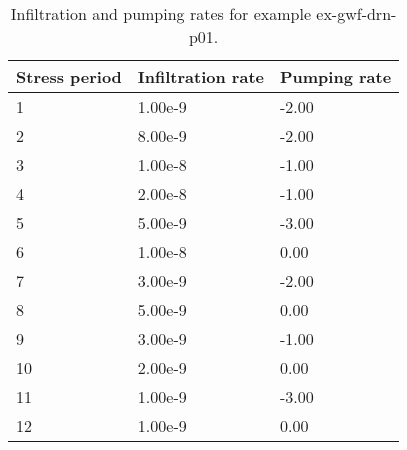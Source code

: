 \small
\begin{longtable}[!htbp]{
                                      p{}
                                      p{}
                                      p{}
                                      }
	\caption{Infiltration and pumping rates for example ex-gwf-drn-p01.} \label{tab:ex-gwf-drn-p01-02} \\

	\hline \hline
	\rowcolor{Gray}
	\textbf{Stress period} & \textbf{Infiltration rate} & \textbf{Pumping rate}  \\
	\hline
	\endhead

		1 & 1.00e-9 & -2.00 \\
		\rowcolor{Gray}
		2 & 8.00e-9 & -2.00 \\
		3 & 1.00e-8 & -1.00 \\
		\rowcolor{Gray}
		4 & 2.00e-8 & -1.00 \\
		5 & 5.00e-9 & -3.00 \\
		\rowcolor{Gray}
		6 & 1.00e-8 & 0.00 \\
		7 & 3.00e-9 & -2.00 \\
		\rowcolor{Gray}
		8 & 5.00e-9 & 0.00 \\
		9 & 3.00e-9 & -1.00 \\
		\rowcolor{Gray}
		10 & 2.00e-9 & 0.00 \\
		11 & 1.00e-9 & -3.00 \\
		\rowcolor{Gray}
		12 & 1.00e-9 & 0.00 \\
	\hline \hline
\end{longtable}
\normalsize

